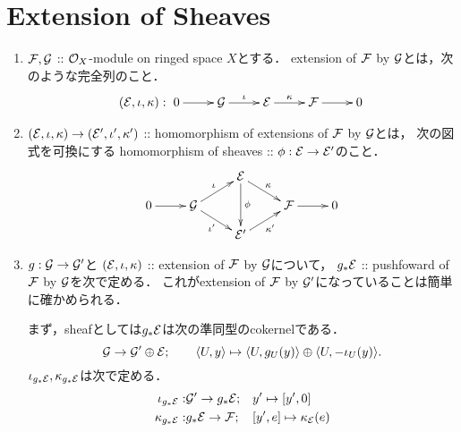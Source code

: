 \documentclass[a4paper]{jsarticle}
\begin{document}
\section{Extension of Sheaves}
    \begin{Def}
        \begin{enumerate}[label=(\roman*), leftmargin=*]
        \item
            $\mathcal{F}, \mathcal{G}$ :: $\mathcal{O}_X$-module on ringed space $X$とする．
            extension of $\mathcal{F}$ by $\mathcal{G}$とは，次のような完全列のこと．
            \[
            (\shE, \iota, \kappa):
                \xymatrix{
                    0 \ar[r]& \shG \ar[r]^-{\iota}& \shE \ar[r]^-{\kappa}& \shF \ar[r]& 0
            }\]

        \item
            $(\mathcal{E}, \iota, \kappa) \to (\mathcal{E}', \iota', \kappa')$
            :: homomorphism of extensions of $\mathcal{F}$ by $\mathcal{G}$とは，
            次の図式を可換にする
            homomorphism of sheaves :: $\phi: \mathcal{E} \to \mathcal{E}'$のこと．
            \[\xymatrix@R=10pt{
                    {}& {}& \shE \ar[dd]^-{\phi} \ar[rd]^-{\kappa}& {}& {} \\
                    0 \ar[r]& \shG \ar[ru]^-{\iota}\ar[rd]_-{\iota'}& {} & \shF \ar[r]& 0 \\
                    {}& {}& \shE' \ar[ru]_-{\kappa'}& {}& {}
            }\]
        
        \item
            $g: \mathcal{G} \to \mathcal{G}'$と
            $(\mathcal{E}, \iota, \kappa)$ :: extension of $\mathcal{F}$ by $\mathcal{G}$について，
            $g_* \mathcal{E}$ :: pushfoward of $\mathcal{F}$ by $\mathcal{G}$を次で定める．
            これがextension of $\mathcal{F}$ by $\mathcal{G}'$になっていることは簡単に確かめられる．

            まず，sheafとしては$g_* \mathcal{E}$は次の準同型のcokernelである．
            \[
                \mathcal{G} \to \mathcal{G}' \oplus \mathcal{E};
                \qquad
                \langle U,y \rangle \mapsto \langle U,g_U(y) \rangle \oplus \langle U,-\iota_U(y) \rangle.
            \]
            $\iota_{g_*\mathcal{E}}, \kappa_{g_*\mathcal{E}}$は次で定める．
            \begin{align*}
                \iota_{g_*\mathcal{E}}:& \mathcal{G}' \to g_*\mathcal{E}; && y' \mapsto [y', 0] \\
                \kappa_{g_*\mathcal{E}}:& g_*\mathcal{E} \to \mathcal{F}; && [y', e] \mapsto \kappa_{\mathcal{E}}(e)
            \end{align*}
    \end{enumerate}
    \end{Def}
\end{document}

